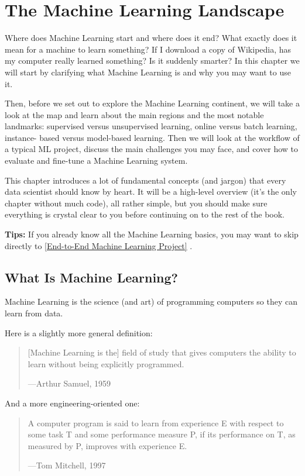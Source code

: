 \chapter{The Machine Learning Landscape\label{The Machine Learning Landscape}}
Where does Machine Learning start and where does it end? What exactly does it
mean for a machine to learn something? If I download a copy of Wikipedia, has my
computer really learned something? Is it suddenly smarter? In this chapter we will
start by clarifying what Machine Learning is and why you may want to use it.

Then, before we set out to explore the Machine Learning continent, we will take a
look at the map and learn about the main regions and the most notable landmarks:
supervised versus unsupervised learning, online versus batch learning, instance-
based versus model-based learning. Then we will look at the workflow of a typical ML
project, discuss the main challenges you may face, and cover how to evaluate and
fine-tune a Machine Learning system.

This chapter introduces a lot of fundamental concepts (and jargon) that every data
scientist should know by heart. It will be a high-level overview (it’s the only chapter
without much code), all rather simple, but you should make sure everything is crystal
clear to you before continuing on to the rest of the book.

\textbf{Tips:} If you already know all the Machine Learning basics, you may want
to skip directly to \autoref{End-to-End Machine Learning Project} .

\section{What Is Machine Learning?}
Machine Learning is the science (and art) of programming computers so they can
learn from data.

Here is a slightly more general definition:
\begin{quotation}
[Machine Learning is the] field of study that gives computers the ability to learn
without being explicitly programmed.
\begin{flushright}
---Arthur Samuel, 1959
\end{flushright}
\end{quotation}

And a more engineering-oriented one:
\begin{quotation}
A computer program is said to learn from experience E with respect to some task T
and some performance measure P, if its performance on T, as measured by P,
improves with experience E.
\begin{flushright}
---Tom Mitchell, 1997
\end{flushright}
\end{quotation}

